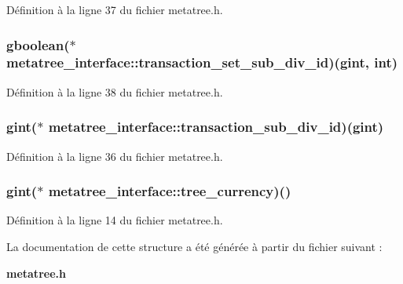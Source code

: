 Définition à la ligne 37 du fichier metatree.h.

\subsubsection[{transaction\_\-set\_\-sub\_\-div\_\-id}]{\setlength{\rightskip}{0pt plus 5cm}gboolean($\ast$  {\bf metatree\_\-interface::transaction\_\-set\_\-sub\_\-div\_\-id})(gint, int)}\label{structmetatree__interface_a91a0a9e7831c6216261b9d1526b665c4}


Définition à la ligne 38 du fichier metatree.h.

\subsubsection[{transaction\_\-sub\_\-div\_\-id}]{\setlength{\rightskip}{0pt plus 5cm}gint($\ast$  {\bf metatree\_\-interface::transaction\_\-sub\_\-div\_\-id})(gint)}\label{structmetatree__interface_a71df7590f3837cc0abcf2ac0c8ef0669}


Définition à la ligne 36 du fichier metatree.h.

\subsubsection[{tree\_\-currency}]{\setlength{\rightskip}{0pt plus 5cm}gint($\ast$  {\bf metatree\_\-interface::tree\_\-currency})()}\label{structmetatree__interface_a7ab40104bf2380d133fb8ea9d6b0dcd1}


Définition à la ligne 14 du fichier metatree.h.



La documentation de cette structure a été générée à partir du fichier suivant :\begin{DoxyCompactItemize}
\item 
{\bf metatree.h}\end{DoxyCompactItemize}
